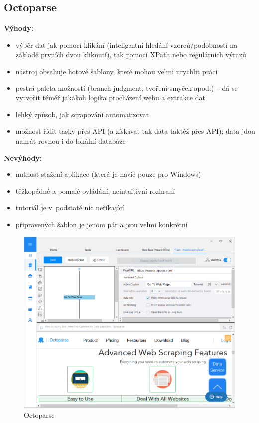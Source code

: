 \documentclass[thesis=B,czech]{FITthesis}[2012/06/26]
\begin{document}
\subsection{Octoparse}
\textbf{Výhody:}
\begin{itemize}
	\item výběr dat jak pomocí klikání (inteligentní hledání vzorců/podobností na základě prvních dvou kliknutí), tak pomocí XPath nebo regulárních výrazů
	\item nástroj obsahuje hotové šablony, které mohou velmi urychlit práci
	\item pestrá paleta možností (branch judgment, tvoření smyček apod.) -- dá se vytvořit téměř jakákoli logika procházení webu a extrakce dat
	\item lehký způsob, jak scrapování automatizovat
	\item možnost řídit tasky přes API (a získávat tak data taktéž přes API); data jdou nahrát rovnou i do lokální databáze
\end{itemize}
\textbf{Nevýhody:}
\begin{itemize}
	\item nutnost stažení aplikace (která je navíc pouze pro Windows)
	\item těžkopádné a pomalé ovládání, neintuitivní rozhraní
	\item tutoriál je v~podstatě nic neříkající
	\item připravených šablon je jenom pár a jsou velmi konkrétní
\end{itemize}
\begin{figure}[h]
	\includegraphics[width=\linewidth]{images/Octoparse.png}
	\caption{Octoparse}
	\label{fig:octoparse}
\end{figure}
\end{document}
